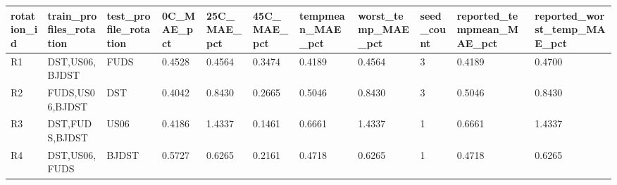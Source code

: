 \begin{tabular}{lllllllllll}
\hline
rotation_id & train_profiles_rotation & test_profile_rotation & 0C_MAE_pct & 25C_MAE_pct & 45C_MAE_pct & tempmean_MAE_pct & worst_temp_MAE_pct & seed_count & reported_tempmean_MAE_pct & reported_worst_temp_MAE_pct \\
\hline
R1 & DST,US06,BJDST & FUDS & 0.4528 & 0.4564 & 0.3474 & 0.4189 & 0.4564 & 3 & 0.4189 & 0.4700 \\
R2 & FUDS,US06,BJDST & DST & 0.4042 & 0.8430 & 0.2665 & 0.5046 & 0.8430 & 3 & 0.5046 & 0.8430 \\
R3 & DST,FUDS,BJDST & US06 & 0.4186 & 1.4337 & 0.1461 & 0.6661 & 1.4337 & 1 & 0.6661 & 1.4337 \\
R4 & DST,US06,FUDS & BJDST & 0.5727 & 0.6265 & 0.2161 & 0.4718 & 0.6265 & 1 & 0.4718 & 0.6265 \\
\hline
\end{tabular}
